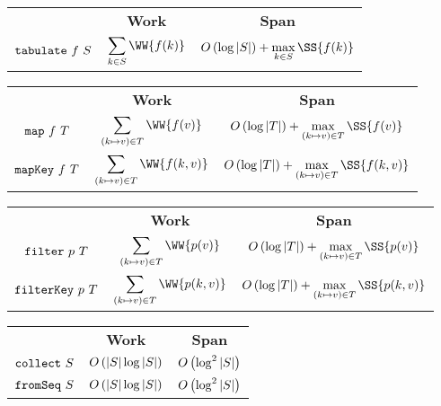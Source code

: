 \begin{costspec}[Tabulate]
\begin{tabular}{c|c|c}
& \textbf{Work} & \textbf{Span} \\
$\texttt{tabulate}~f~S$ &
$\displaystyle\sum_{k \in S} \WW {f(k)}$ &
$\bigoh{\log|S|} + \displaystyle\max_{k \in S} \SS{f(k)}$
\end{tabular}
\end{costspec}

\begin{costspec}[Map]
\begin{tabular}{c|c|c}
& \textbf{Work} & \textbf{Span} \\
$\texttt{map}~f~T$ &
$\displaystyle\sum_{(k \mapsto v) \in T} \WW {f(v)}$ &
$\bigoh{\log|T|} + \displaystyle\max_{(k \mapsto v) \in T} \SS{f(v)}$
\\
$\texttt{mapKey}~f~T$ &
$\displaystyle\sum_{(k \mapsto v) \in T} \WW {f(k,v)}$ &
$\bigoh{\log|T|} + \displaystyle\max_{(k \mapsto v) \in T} \SS{f(k,v)}$
\end{tabular}
\end{costspec}

\begin{costspec}[Filter]
\begin{tabular}{c|c|c}
& \textbf{Work} & \textbf{Span} \\
$\texttt{filter}~p~T$ &
$\displaystyle\sum_{(k \mapsto v) \in T} \WW {p(v)}$ &
$\bigoh{\log|T|} + \displaystyle\max_{(k \mapsto v) \in T} \SS{p(v)}$
\\
$\texttt{filterKey}~p~T$ &
$\displaystyle\sum_{(k \mapsto v) \in T} \WW {p(k,v)}$ &
$\bigoh{\log|T|} + \displaystyle\max_{(k \mapsto v) \in T} \SS{p(k,v)}$
\end{tabular}
\end{costspec}

\begin{costspec}
\begin{tabular}{c|c|c}
& \textbf{Work} & \textbf{Span} \\
$\texttt{collect}~S$ & $O\left({|S|\log|S|}\right)$ & $O\left({\log^2|S|}\right)$ \\
$\texttt{fromSeq}~S$ & $O\left({|S|\log|S|}\right)$ & $O\left({\log^2|S|}\right)$
\end{tabular}
\end{costspec}

